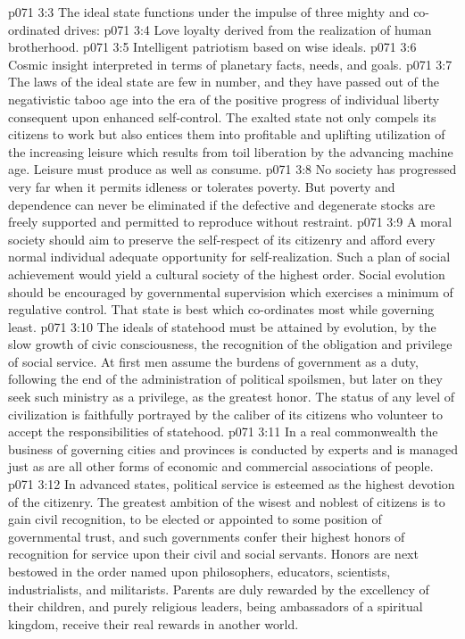 \pc \vs p071 3:3 The ideal state functions under the impulse of three mighty and co\hyp{}ordinated drives:
\pc \vs p071 3:4 \bibnobreakspace Love loyalty derived from the realization of human brotherhood.
\vs p071 3:5 \bibnobreakspace Intelligent patriotism based on wise ideals.
\vs p071 3:6 \bibnobreakspace Cosmic insight interpreted in terms of planetary facts, needs, and goals.
\pc \vs p071 3:7 The laws of the ideal state are few in number, and they have passed out of the negativistic taboo age into the era of the positive progress of individual liberty consequent upon enhanced self\hyp{}control. The exalted state not only compels its citizens to work but also entices them into profitable and uplifting utilization of the increasing leisure which results from toil liberation by the advancing machine age. Leisure must produce as well as consume.
\vs p071 3:8 No society has progressed very far when it permits idleness or tolerates poverty. But poverty and dependence can never be eliminated if the defective and degenerate stocks are freely supported and permitted to reproduce without restraint.
\vs p071 3:9 A moral society should aim to preserve the self\hyp{}respect of its citizenry and afford every normal individual adequate opportunity for self\hyp{}realization. Such a plan of social achievement would yield a cultural society of the highest order. Social evolution should be encouraged by governmental supervision which exercises a minimum of regulative control. That state is best which co\hyp{}ordinates most while governing least.
\vs p071 3:10 The ideals of statehood must be attained by evolution, by the slow growth of civic consciousness, the recognition of the obligation and privilege of social service. At first men assume the burdens of government as a duty, following the end of the administration of political spoilsmen, but later on they seek such ministry as a privilege, as the greatest honor. The status of any level of civilization is faithfully portrayed by the caliber of its citizens who volunteer to accept the responsibilities of statehood.\plusone
\vs p071 3:11 In a real commonwealth the business of governing cities and provinces is conducted by experts and is managed just as are all other forms of economic and commercial associations of people.
\vs p071 3:12 In advanced states, political service is esteemed as the highest devotion of the citizenry. The greatest ambition of the wisest and noblest of citizens is to gain civil recognition, to be elected or appointed to some position of governmental trust, and such governments confer their highest honors of recognition for service upon their civil and social servants. Honors are next bestowed in the order named upon philosophers, educators, scientists, industrialists, and militarists. Parents are duly rewarded by the excellency of their children, and purely religious leaders, being ambassadors of a spiritual kingdom, receive their real rewards in another world.
